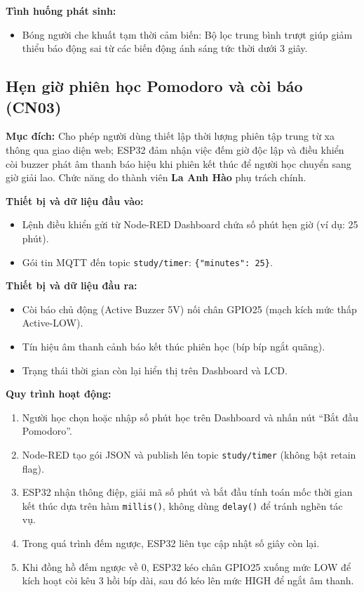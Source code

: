 \textbf{Tình huống phát sinh:}
\begin{itemize}
    \item Bóng người che khuất tạm thời cảm biến: Bộ lọc trung bình trượt giúp giảm thiểu báo động sai từ các biến động ánh sáng tức thời dưới 3 giây.
\end{itemize}

\subsection{Hẹn giờ phiên học Pomodoro và còi báo (CN03)}
\textbf{Mục đích:}
Cho phép người dùng thiết lập thời lượng phiên tập trung từ xa thông qua giao diện web; ESP32 đảm nhận việc đếm giờ độc lập và điều khiển còi buzzer phát âm thanh báo hiệu khi phiên kết thúc để người học chuyển sang giờ giải lao. Chức năng do thành viên \textbf{La Anh Hào} phụ trách chính.

\textbf{Thiết bị và dữ liệu đầu vào:}
\begin{itemize}
    \item Lệnh điều khiển gửi từ Node-RED Dashboard chứa số phút hẹn giờ (ví dụ: 25 phút).
    \item Gói tin MQTT đến topic \texttt{study/timer}: \texttt{\{"minutes": 25\}}.
\end{itemize}

\textbf{Thiết bị và dữ liệu đầu ra:}
\begin{itemize}
    \item Còi báo chủ động (Active Buzzer 5V) nối chân GPIO25 (mạch kích mức thấp Active-LOW).
    \item Tín hiệu âm thanh cảnh báo kết thúc phiên học (bíp bíp ngắt quãng).
    \item Trạng thái thời gian còn lại hiển thị trên Dashboard và LCD.
\end{itemize}

\textbf{Quy trình hoạt động:}
\begin{enumerate}
    \item Người học chọn hoặc nhập số phút học trên Dashboard và nhấn nút ``Bắt đầu Pomodoro''.
    \item Node-RED tạo gói JSON và publish lên topic \texttt{study/timer} (không bật retain flag).
    \item ESP32 nhận thông điệp, giải mã số phút và bắt đầu tính toán mốc thời gian kết thúc dựa trên hàm \texttt{millis()}, không dùng \texttt{delay()} để tránh nghẽn tác vụ.
    \item Trong quá trình đếm ngược, ESP32 liên tục cập nhật số giây còn lại.
    \item Khi đồng hồ đếm ngược về 0, ESP32 kéo chân GPIO25 xuống mức LOW để kích hoạt còi kêu 3 hồi bíp dài, sau đó kéo lên mức HIGH để ngắt âm thanh.
\end{enumerate}

